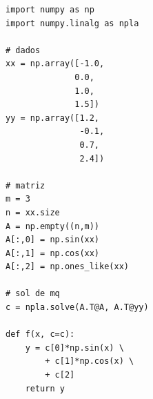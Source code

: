 \begin{ex}
\begin{lstlisting}[caption=mqCurva.py]
import numpy as np
import numpy.linalg as npla

# dados
xx = np.array([-1.0,
              0.0,
              1.0,
              1.5])
yy = np.array([1.2,
               -0.1,
               0.7,
               2.4])

# matriz
m = 3
n = xx.size
A = np.empty((n,m))
A[:,0] = np.sin(xx)
A[:,1] = np.cos(xx)
A[:,2] = np.ones_like(xx)

# sol de mq
c = npla.solve(A.T@A, A.T@yy)

def f(x, c=c):
    y = c[0]*np.sin(x) \
        + c[1]*np.cos(x) \
        + c[2]
    return y
\end{lstlisting}

\end{ex}


